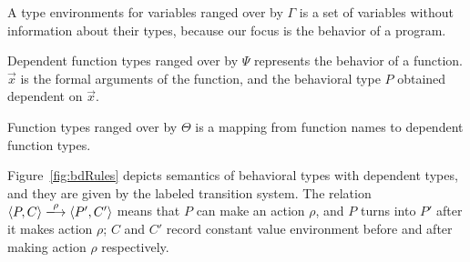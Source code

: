 A type environments for variables ranged over by \(\Gamma\) is a set
of variables without information about their types, because our
focus is the behavior of a program.

Dependent function types ranged over by \(\Psi\) represents the
behavior of a function. \(\vec{x}\) is the formal arguments of the
function, and the behavioral type \(P\) obtained dependent on
\(\vec{x}\).

Function types ranged over by \(\Theta\) is a mapping from function names to dependent function types.





Figure~\ref{fig:bdRules} depicts semantics of behavioral types with
dependent types, and they are given by the labeled transition
system. The relation \( \langle P, C \rangle \xlongrightarrow{\rho}
\langle P', C' \rangle \) means that \(P\) can make an action
\(\rho\), and \(P\) turns into \(P'\) after it makes action \(\rho\);
\(C\) and \(C'\) record constant value environment before and after
making action \(\rho\) respectively.


